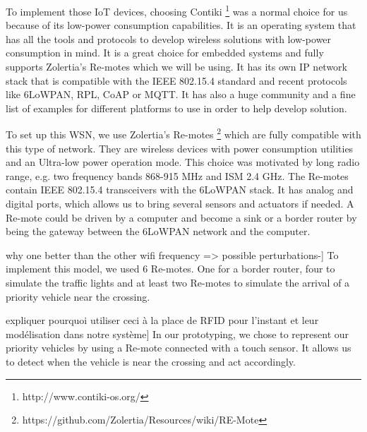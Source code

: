 To implement those IoT devices,
	choosing Contiki \footnote{http://www.contiki-os.org/} was a normal choice for us because of its low-power consumption capabilities.
It is an operating system that has all the tools and protocols to develop wireless solutions with low-power consumption in mind.
It is a great choice for embedded systems and fully supports Zolertia's Re-motes which we will be using.
It has its own IP network stack that is compatible with the IEEE 802.15.4 standard and recent protocols like 6LoWPAN,
	RPL,
	CoAP or MQTT.
It has also a huge community and a fine list of examples for different platforms to use in order to help develop solution.

To set up this WSN,
	we use Zolertia's Re-motes \footnote{https://github.com/Zolertia/Resources/wiki/RE-Mote} which are fully compatible with this type of network.
They are wireless devices with power consumption utilities and an Ultra-low power operation mode.
This choice was motivated by long radio range,
	e.g.
two frequency bands 868-915 MHz and ISM 2.4 GHz.
The Re-motes contain IEEE 802.15.4 transceivers with the 6LoWPAN stack.
It has analog and digital ports,
	which allows us to bring several sensors and actuators if needed.
A Re-mote could be driven by a computer and become a sink or a border router by being the gateway between the 6LoWPAN network and the computer.

why one better than the other wifi frequency => possible perturbations-] To implement this model,
	we used 6 Re-motes.
One for a border router,
	four to simulate the traffic lights and at least two Re-motes to simulate the arrival of a priority vehicle near the crossing.

expliquer pourquoi utiliser ceci à la place de RFID pour l'instant et leur modélisation dans notre système] In our prototyping,
	we chose to represent our priority vehicles by using a Re-mote connected with a touch sensor.
It allows us to detect when the vehicle is near the crossing and act accordingly.

